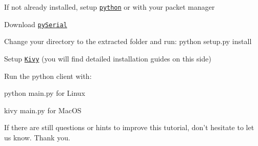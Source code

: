 \begin{DoxyEnumerate}
\item If not already installed, setup \href{https://www.python.org/download/}{\tt python} or with your packet manager
\item Download \href{https://pypi.python.org/pypi/pyserial}{\tt py\+Serial}
\item Change your directory to the extracted folder and run\+: {\ttfamily python setup.\+py install}
\item Setup \href{http://kivy.org/#download}{\tt Kivy} (you will find detailed installation guides on this side)
\item Run the python client with\+:
\begin{DoxyItemize}
\item {\ttfamily python main.\+py} for Linux
\item {\ttfamily kivy main.\+py} for Mac\+O\+S
\end{DoxyItemize}
\end{DoxyEnumerate}

If there are still questions or hints to improve this tutorial, don't hesitate to let us know. Thank you. 